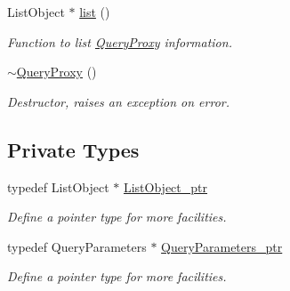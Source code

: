 \begin{DoxyCompactItemize}
ListObject $\ast$ \hyperlink{classQueryProxy_a23e516962073ad50a0375ff3c38cb77a}{list} ()
\begin{DoxyCompactList}\small\item\em Function to list \hyperlink{classQueryProxy}{QueryProxy} information. \item\end{DoxyCompactList}\item 
\hyperlink{classQueryProxy_a318cd724c4bf2f2cc3103f9dc788bd7b}{$\sim$QueryProxy} ()
\begin{DoxyCompactList}\small\item\em Destructor, raises an exception on error. \item\end{DoxyCompactList}\end{DoxyCompactItemize}
\subsection*{Private Types}
\begin{DoxyCompactItemize}
\item 
\hypertarget{classQueryProxy_a2ed29ef6f2e7de15a59c3fc9e48dcd76}{
typedef ListObject $\ast$ \hyperlink{classQueryProxy_a2ed29ef6f2e7de15a59c3fc9e48dcd76}{ListObject\_\-ptr}}
\label{classQueryProxy_a2ed29ef6f2e7de15a59c3fc9e48dcd76}

\begin{DoxyCompactList}\small\item\em Define a pointer type for more facilities. \item\end{DoxyCompactList}\item 
\hypertarget{classQueryProxy_a92bffb52502dff5376c6f5760920866b}{
typedef QueryParameters $\ast$ \hyperlink{classQueryProxy_a92bffb52502dff5376c6f5760920866b}{QueryParameters\_\-ptr}}
\label{classQueryProxy_a92bffb52502dff5376c6f5760920866b}

\begin{DoxyCompactList}\small\item\em Define a pointer type for more facilities. \item\end{DoxyCompactList}\end{DoxyCompactItemize}
